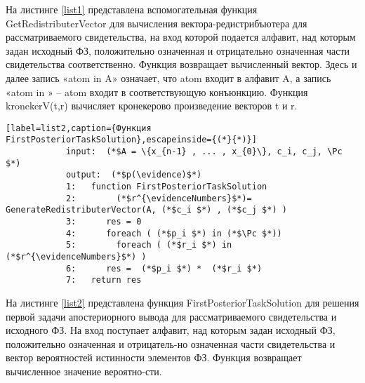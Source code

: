         На листинге \ref{list1} представлена вспомогательная функция GetRedistributer\-Vector для вычисления вектора-редистрибъютера для рассматриваемого свидетельства, на вход которой подается алфавит, над которым задан исходный ФЗ, положительно означенная и отрицательно означенная части свидетельства соответственно. Функция возвращает вычисленный вектор. Здесь и далее запись «atom in A» означает, что atom входит в алфавит A, а запись «atom in » -- atom входит в соответствующую конъюнкцию. Функция kronekerV(t,r) вычисляет кронекерово произведение векторов t и r.
        
        \begin{lstlisting}[label=list2,caption={Функция FirstPosteriorTaskSolution},escapeinside={(*}{*)}]
            input:  (*$A = \{x_{n-1} , ... , x_{0}\}, c_i, c_j, \Pc $*)	
            output:  (*$p(\evidence)$*) 
            1:   function FirstPosteriorTaskSolution
            2:   	  (*$r^{\evidenceNumbers}$*)= GenerateRedistributerVector(A, (*$c_i $*) , (*$c_j $*) )
            3:	    res = 0
            4:   	foreach ( (*$p_i $*) in (*$\Pc $*))
            5:	      foreach ( (*$r_i $*) in (*$r^{\evidenceNumbers}$*) )
            6:		res =  (*$p_i $*) *  (*$r_i $*) 
            7:	 return res
        \end{lstlisting}
        
        На листинге \ref{list2} представлена функция FirstPosteriorTaskSolution для решения первой задачи апостериорного вывода для рассматриваемого свидетельства и исходного ФЗ. На вход поступает алфавит, над которым задан исходный ФЗ, положительно означенная и отрицатель-но означенная части свидетельства и вектор вероятностей истинности элементов ФЗ. Функция возвращает вычисленное значение вероятно-сти.
        
